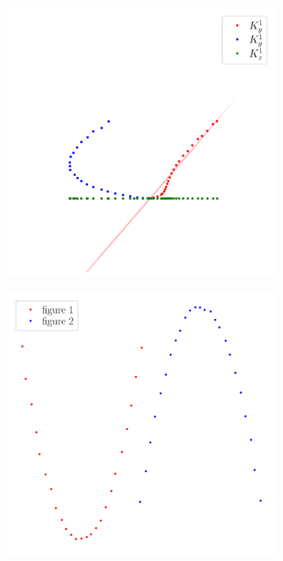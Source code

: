 \documentclass[12pt, twoside]{article}
\numberwithin{equation}{section}
\begin{document}
\begin{figure}
     \centering
     \begin{subfigure}[b]{0.3\textwidth}
         \centering
         \includegraphics[width=\textwidth]{figures/explanation_exp1}
         \caption{}
         \label{intro:fig2:exp1}
     \end{subfigure}
     \begin{subfigure}[b]{0.3\textwidth}
         \centering
         \includegraphics[width=\textwidth]{figures/explanation}

\end{subfigure}
\end{figure}
\end{document}
